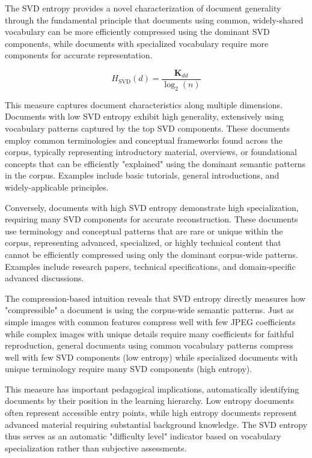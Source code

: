 \documentclass[12pt,a4paper]{article}
\begin{document}
The SVD entropy provides a novel characterization of document generality through the fundamental principle that documents using common, widely-shared vocabulary can be more efficiently compressed using the dominant SVD components, while documents with specialized vocabulary require more components for accurate representation.

\begin{equation}
H_{\text{SVD}}(d) = \frac{\mathbf{K}_{dd}}{\log_2(n)}
\end{equation}

This measure captures document characteristics along multiple dimensions. Documents with low SVD entropy exhibit high generality, extensively using vocabulary patterns captured by the top SVD components. These documents employ common terminologies and conceptual frameworks found across the corpus, typically representing introductory material, overviews, or foundational concepts that can be efficiently "explained" using the dominant semantic patterns in the corpus. Examples include basic tutorials, general introductions, and widely-applicable principles.

Conversely, documents with high SVD entropy demonstrate high specialization, requiring many SVD components for accurate reconstruction. These documents use terminology and conceptual patterns that are rare or unique within the corpus, representing advanced, specialized, or highly technical content that cannot be efficiently compressed using only the dominant corpus-wide patterns. Examples include research papers, technical specifications, and domain-specific advanced discussions.

The compression-based intuition reveals that SVD entropy directly measures how "compressible" a document is using the corpus-wide semantic patterns. Just as simple images with common features compress well with few JPEG coefficients while complex images with unique details require many coefficients for faithful reproduction, general documents using common vocabulary patterns compress well with few SVD components (low entropy) while specialized documents with unique terminology require many SVD components (high entropy).

This measure has important pedagogical implications, automatically identifying documents by their position in the learning hierarchy. Low entropy documents often represent accessible entry points, while high entropy documents represent advanced material requiring substantial background knowledge. The SVD entropy thus serves as an automatic "difficulty level" indicator based on vocabulary specialization rather than subjective assessments.
\end{document}
